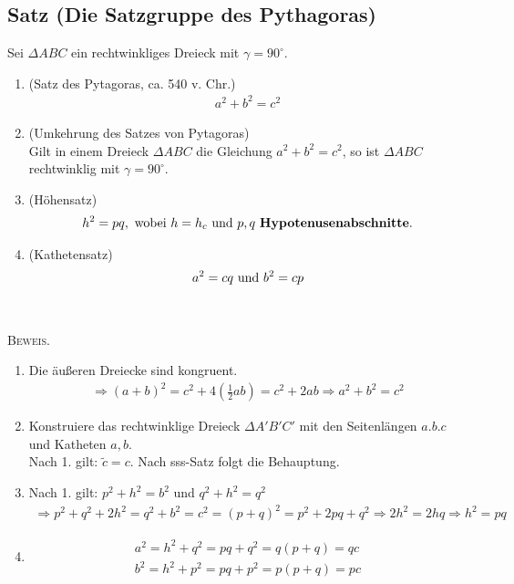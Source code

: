 	
\subsection[Die Satzgruppe des Pythagoras]{Satz (Die Satzgruppe des Pythagoras)}

	Sei $\Delta ABC$ ein rechtwinkliges Dreieck mit $\gamma=90^{\circ}$.
	\begin{enumerate}
	\item (Satz des Pytagoras, ca. 540 v. Chr.)\\
	\begin{align*}
	a^2+b^2=c^2
	\end{align*}
	
	\item (Umkehrung des Satzes von Pytagoras)\\
	Gilt in einem Dreieck $\Delta ABC$ die Gleichung $a^2+b^2=c^2$, so ist $\Delta ABC$ rechtwinklig mit 
	$\gamma = 90^{\circ}$.
	
	\item (Höhensatz)\\
	\begin{align*}
	h^2=pq, \textnormal{ wobei } h=h_c \textnormal{ und } p,q \textnormal{ \textbf{Hypotenusenabschnitte}}.
	\end{align*}
	
	\item (Kathetensatz)
	\begin{align*}
	a^2=cq \textnormal{ und } b^2=cp
	\end{align*}
	\end{enumerate}
	~\newline\newline
	
	\textsc{Beweis.}
	
	\begin{enumerate}
	\item Die äußeren Dreiecke sind kongruent.
	\begin{align*}
	\Rightarrow (a+b)^2=c^2+4(\frac{1}{2}ab)=c^2+2ab\Rightarrow a^2+b^2=c^2
	\end{align*}
	
	\item Konstruiere das rechtwinklige Dreieck $\Delta A'B'C'$ mit den Seitenlängen $a.b.c$ und Katheten $a,b$.\\
	Nach 1. gilt: $\tilde{c}=c$. Nach sss-Satz folgt die Behauptung.
	
	\item Nach 1. gilt: $p^2+h^2=b^2$ und $q^2+h^2=q^2$
	\begin{align*}
	\Rightarrow p^2+q^2+2h^2=q^2+b^2=c^2=(p+q)^2=p^2+2pq+q^2 \Rightarrow 2h^2=2hq\Rightarrow h^2=pq
	\end{align*}
	
	\item
	\begin{align*}
	a^2=h^2+q^2=pq+q^2=q(p+q)=qc\\
	b^2=h^2+p^2=pq+p^2=p(p+q)=pc
	\end{align*}
	
	\end{enumerate}


